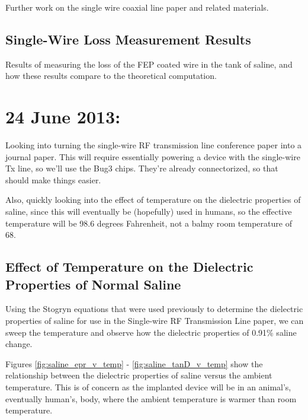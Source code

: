 \documentclass[12pt,onecolumn,titlepage]{article}
\begin{document}
\indent \indent Further work on the single wire coaxial line paper and related materials.

\subsection{Single-Wire Loss Measurement Results}
\indent \indent Results of measuring the loss of the FEP coated wire in the tank of saline, and how these results compare to the theoretical computation.





\clearpage
\section{24 June 2013:}

\indent \indent Looking into turning the single-wire RF transmission line conference paper into a journal paper. This will require essentially powering a device with the single-wire Tx line, so we'll use the Bug3 chips. They're already connectorized, so that should make things easier. 

Also, quickly looking into the effect of temperature on the dielectric properties of saline, since this will eventually be (hopefully) used in humans, so the effective temperature will be 98.6 degrees Fahrenheit, not a balmy room temperature of 68. 

\subsection{Effect of Temperature on the Dielectric Properties of Normal Saline}
\indent \indent Using the Stogryn equations that were used previously to determine the dielectric properties of saline for use in the Single-wire RF Transmission Line paper, we can sweep the temperature and observe how the dielectric properties of 0.91\% saline change.

Figures \ref{fig:saline_epr_v_temp} - \ref{fig:saline_tanD_v_temp} show the relationship between the dielectric properties of saline versus the ambient temperature. This is of concern as the implanted device will be in an animal's, eventually human's, body, where the ambient temperature is warmer than room temperature.
\end{document}

